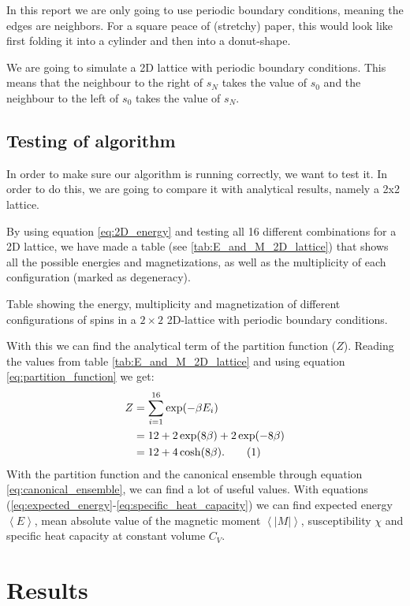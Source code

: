 \documentclass[reprint, english,notitlepage,nofootinbib]{revtex4-1}  %
\newcommand\numberthis{\addtocounter{equation}{1}\tag{\theequation}}
\begin{document}
In this report we are only going to use periodic boundary conditions, meaning the edges are neighbors. For a square peace of (stretchy) paper, this would look like first folding it into a cylinder and then into a donut-shape.

We are going to simulate a 2D lattice with periodic boundary conditions. This means that the neighbour to the right of $s_N$ takes the value of $s_0$ and the neighbour to the left of $s_0$ takes the value of $s_N$.

\subsection{Testing of algorithm}

In order to make sure our algorithm is running correctly, we want to test it. In order to do this, we are going to compare it with analytical results, namely a 2x2 lattice.

By using equation \eqref{eq:2D_energy} and testing all 16 different combinations for a 2D lattice, we have made a table (see \ref{tab:E_and_M_2D_lattice}) that shows all the possible energies and magnetizations, as well as the multiplicity of each configuration (marked as degeneracy).
\begin{table}[h]
	
	\caption{Table showing the energy, multiplicity and magnetization of different configurations of spins in a $2 \times 2$ 2D-lattice with periodic boundary conditions.}
	\label{tab:E_and_M_2D_lattice}
\end{table}
With this we can find the analytical term of the partition function ($Z$). Reading the values from table \ref{tab:E_and_M_2D_lattice} and using equation \eqref{eq:partition_function} we get:
\begin{align*}
Z &= \sum_{i = 1}^{16} \exp(-\beta E_i) \\
&= 12 + 2\exp(8\beta) + 2\exp(-8\beta) \\
&= 12 + 4\cosh(8\beta). \numberthis \label{eq:2Dpartition_function}
\end{align*}
With the partition function and the canonical ensemble through equation \eqref{eq:canonical_ensemble}, we can find a lot of useful values. With equations (\ref{eq:expected_energy}-\ref{eq:specific_heat_capacity}) we can find expected energy $\left<E\right	>$, mean absolute value of the magnetic moment $\left<|M|\right>$, susceptibility $\chi$ and specific heat capacity at constant volume $C_V$.

\section{Results}
\end{document}
